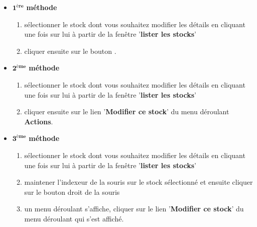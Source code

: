 \begin{itemize}[]
	\item \textcolor{purplish}{$\mathbf{1^{\text{\`ere}}}$ \textbf{m\'ethode}}
	\begin{enumerate}[1)]
		\item s\'electionner le stock dont vous souhaitez
		modifier les d\'etails en cliquant une fois sur lui
		\` a partir de la fen\^etre '\textbf{lister les stocks}'
		
		\item cliquer ensuite sur le bouton .	\\
	\end{enumerate}
	
	\item \textcolor{purplish}{$\mathbf{2^{\text{\`eme}}}$ \textbf{m\'ethode}}
	\begin{enumerate}[1)]
		\item s\'electionner le stock dont vous souhaitez
		modifier les d\'etails en cliquant une fois sur lui
		\` a partir de la fen\^etre '\textbf{lister les stocks}'
		
		\item cliquer ensuite sur le lien '\textbf{Modifier ce stock}'
		du menu d\'eroulant \textbf{Actions}.\\
	\end{enumerate}
	
	\item \textcolor{purplish}{$\mathbf{3^{\text{\`eme}}}$ \textbf{m\'ethode}}
	\begin{enumerate}[1)]
		\item s\'electionner le stock dont vous souhaitez
		modifier les d\'etails en cliquant une fois sur lui
		\` a partir de la fen\^etre '\textbf{lister les stocks}'
		
		\item maintener l'indexeur de la souris sur le stock
		s\'electionn\'e et ensuite cliquer sur le bouton
		droit de la souris
		
		\item un menu d\'eroulant s'affiche, cliquer sur
		le lien '\textbf{Modifier ce stock}' du	menu
		d\'eroulant qui s'est affich\'e.\\
	\end{enumerate}
\end{itemize}


\newpage
{}

